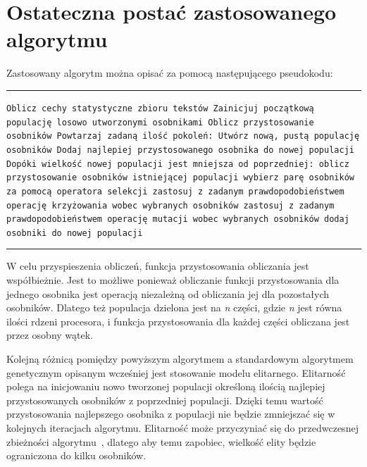 \documentclass{xmgr}
\begin{document}
\section{Ostateczna postać zastosowanego algorytmu}

Zastosowany algorytm można opisać za pomocą następującego pseudokodu:

\noindent
\rule{380pt}{0.5pt}\newline
\texttt{Oblicz cechy statystyczne zbioru tekstów\newline
Zainicjuj początkową populację losowo utworzonymi osobnikami\newline
Oblicz przystosowanie osobników\newline
Powtarzaj zadaną ilość pokoleń:\newline
\indent Utwórz nową, pustą populację osobników\newline
\indent Dodaj najlepiej przystosowanego osobnika do nowej populacji\newline
\indent Dopóki wielkość nowej populacji jest mniejsza od poprzedniej:\newline
\indent\indent oblicz przystosowanie osobników istniejącej populacji\newline
\indent\indent wybierz parę osobników za pomocą operatora selekcji\newline
\indent\indent zastosuj z zadanym prawdopodobieństwem operację krzyżowania\newline
\indent\indent wobec wybranych osobników\newline
\indent\indent zastosuj z zadanym prawdopodobieństwem operację mutacji\newline
\indent\indent wobec wybranych osobników\newline
\indent\indent dodaj osobniki do nowej populacji\newline
}
\rule{380pt}{0.5pt}\newline

W celu przyspieszenia obliczeń, funkcja przystosowania obliczania jest współbieżnie. Jest to możliwe ponieważ obliczanie funkcji przystosowania dla jednego osobnika jest operacją niezależną od obliczania jej dla pozostałych osobników. Dlatego też populacja dzielona jest na \emph{n} części, gdzie \emph{n} jest równa ilości rdzeni procesora, i funkcja przystosowania dla każdej części obliczana jest przez osobny wątek.

Kolejną różnicą pomiędzy powyższym algorytmem a standardowym algorytmem genetycznym opisanym wcześniej jest stosowanie modelu elitarnego. Elitarność polega na inicjowaniu nowo tworzonej populacji określoną ilością najlepiej przystosowanych osobników z poprzedniej populacji. Dzięki temu wartość przystosowania najlepszego osobnika z populacji nie będzie zmniejszać się w kolejnych iteracjach algorytmu. Elitarność może przyczyniać się do przedwczesnej zbieżności algorytmu~\cite{Luke2009Metaheuristics}, dlatego aby temu zapobiec, wielkość elity będzie ograniczona do kilku osobników.
\end{document}
